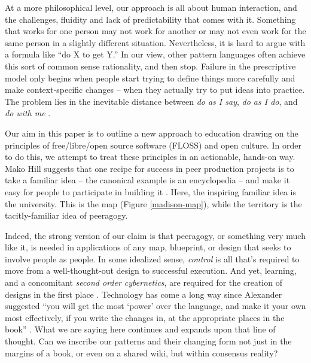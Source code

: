 At a more philosophical level, our approach is all about human interaction, and the challenges, fluidity and lack of predictability that comes with it.  Something that works for one person may not work for another or may not even work for the same person in a slightly different situation.  Nevertheless, it is hard to argue with a formula like ``do X to get Y.'' In our view, other pattern languages often achieve this sort of common sense rationality, and then stop.  Failure in the prescriptive model only begins when people start trying to define things more carefully and make context-specific changes -- when they actually try to put ideas into practice.  The problem lies in the inevitable distance between \emph{do as I say}, \emph{do as I do}, and \emph{do with me} \cite[p.~26]{deleuze1994difference}.

Our aim in this paper is to outline a new approach to education drawing on the principles of free/libre/open source software (FLOSS) and open culture.  In order to do this, we attempt to treat these principles in an actionable, hands-on way.  Mako Hill suggests that one recipe for success in peer production projects is to take a familiar idea -- the canonical example is an encyclopedia -- and make it easy for people to participate in building it \cite{almost-wikipedia}.  Here, the inspiring familiar idea is the university.  This is the map (Figure \ref{madison-map}), while the territory is the tacitly-familiar idea of peeragogy.

Indeed, the strong version of our claim is that peeragogy, or something very much like it, is needed in applications of any map, blueprint, or design that seeks to involve people as people.  In some idealized sense, \emph{control} is all that's required to move from a well-thought-out design to successful execution.  And yet, learning, and a concomitant \emph{second order cybernetics}, are required for the creation of designs in the first place \cite{von2003cybernetics}.  Technology has come a long way since Alexander suggested ``you will get the most `power' over the language, and make it your own most effectively, if you write the changes in, at the appropriate places in the book'' \cite[p.~xl]{alexander1977pattern}.  What we are saying here continues and expands upon that line of thought.  Can we inscribe our patterns and their changing form not just in the margins of a book, or even on a shared wiki, but within consensus reality?

